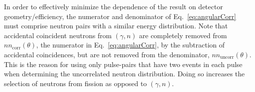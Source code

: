 \label{sec:n_n_erg_dist}
In order to effectively minimize the dependence of the result on detector geometry/efficiency, the numerator and denominator of Eq.~\ref{eq:angularCorr} must comprise neutron pairs with a similar energy distribution.
Note that accidental coincident neutrons from $(\gamma,n)$ are completely removed from $nn_{\text{corr}}(\theta)$, the numerator in Eq.~\ref{eq:angularCorr}, by the subtraction of accidental coincidences, but are not removed from the denominator, $nn_{\text{uncorr}}(\theta)$.
This is the reason for using only pulse-pairs that have two events in each pulse when determining the uncorrelated neutron distribution.
Doing so increases the selection of neutrons from fission as opposed to $(\gamma,n)$. 

